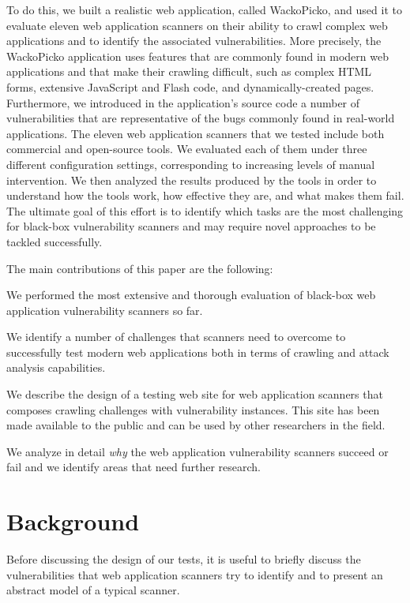 To do this, we built a realistic web application, called WackoPicko, and used it
to evaluate eleven web application scanners on their ability to crawl
complex web applications and to identify the associated vulnerabilities. 
%
More precisely, the WackoPicko application uses features that are
commonly found in modern web applications and that make their crawling
difficult, such as complex HTML forms, extensive JavaScript and Flash code,
and dynamically-created pages.
%
Furthermore, we introduced in the application's source code a number of
vulnerabilities that are representative of the bugs commonly found in
real-world applications.
%
The eleven web application scanners that we tested include both commercial
and open-source tools. We evaluated each of them under three different
configuration settings, corresponding to increasing levels of manual
intervention.
%
We then analyzed the results produced by the tools in order to
understand how the tools work, how effective they are, and what makes
them fail. The ultimate goal of this effort is to identify which tasks
are the most challenging for black-box vulnerability scanners and may
require novel approaches to be tackled successfully. 

The main contributions of this paper are the following:
\begin{compactitem}
\item We performed the most extensive and thorough evaluation of black-box 
web application vulnerability scanners so far.
\item We identify a number of challenges that scanners
need to overcome to successfully test modern web applications both in terms
of crawling and attack analysis capabilities.
\item We describe the design of a testing web site for web application
scanners that composes crawling challenges with vulnerability instances.
This site has been made available to the public and can be used by other
researchers in the field.
\item We analyze in  detail \emph{why} the web application vulnerability
  scanners succeed or fail and we identify areas that need further research.
\end{compactitem}


\section{Background}

Before discussing the design of our tests, it is useful to briefly discuss the
vulnerabilities that web application scanners try to identify and to present
an abstract model of a typical scanner.

